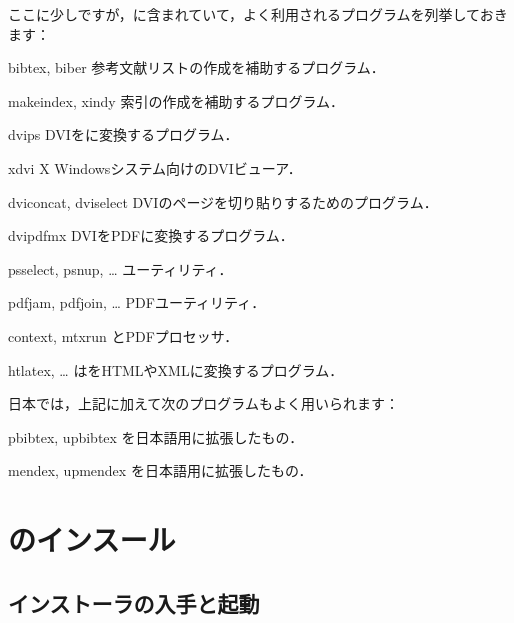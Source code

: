 \documentclass[uplatex,dvipdfmx,tombow]{jsarticle}
\begin{document}
ここに少しですが，\TL に含まれていて，よく利用されるプログラムを列挙しておきます：
%
\begin{cmddescription}
\item[bibtex, biber]
参考文献リストの作成を補助するプログラム．

\item[makeindex, xindy]
索引の作成を補助するプログラム．

\item[dvips]
DVIを\PS に変換するプログラム．

\item[xdvi]
X Windowsシステム向けのDVIビューア．

\item[dviconcat, dviselect]
DVIのページを切り貼りするためのプログラム．

\item[dvipdfmx]
DVIをPDFに変換するプログラム．

\item[psselect, psnup, \ldots]
\PS ユーティリティ．

\item[pdfjam, pdfjoin, \ldots]
PDFユーティリティ．

\item[context, mtxrun]
\ConTeXt とPDFプロセッサ．

\item[htlatex, \ldots]
は\AllTeX をHTMLやXMLに変換するプログラム．
\end{cmddescription}

\begin{janote}
日本では，上記に加えて次のプログラムもよく用いられます：
%
\begin{cmddescription}
\item[pbibtex, upbibtex]
を日本語用に拡張したもの．

\item[mendex, upmendex]
を日本語用に拡張したもの．
\end{cmddescription}
\end{janote}

\section{\TL のインスール}
\label{sec:install}

\subsection{インストーラの入手と起動}
\label{sec:inst-start}
\end{document}
